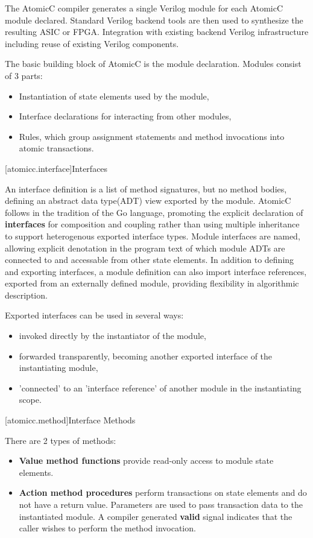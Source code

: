 The AtomicC compiler 
generates a single Verilog module for each AtomicC module declared.
Standard Verilog backend tools are then used to synthesize
the resulting ASIC or FPGA.
Integration with existing backend Verilog infrastructure including reuse of existing Verilog
components.

The basic building block of AtomicC is the module declaration.
Modules consist of 3 parts:
\begin{itemize}
\item Instantiation of state elements used by the module,
\item Interface declarations for interacting from other modules,
\item Rules, which group assignment statements and method invocations into atomic transactions.
\end{itemize}

[atomicc.interface]{Interfaces}

An interface definition is a list of method signatures, but no method bodies, defining
an abstract data type(ADT) \cite{Liskov74programmingwith} view exported by the module.
AtomicC follows in the tradition of the Go language\cite{Pike2012},
promoting the explicit declaration of \textbf{interfaces} for composition and
coupling rather than using multiple inheritance to support heterogenous exported interface types.
Module interfaces are named, 
allowing explicit denotation in the program text
of which module ADTs are connected to and accessable from other state elements.
In addition to defining and exporting interfaces,
a module definition can also import
interface references, exported from an
externally defined module, providing flexibility in algorithmic description.

Exported interfaces can be used in several ways:
\begin{itemize}
\item invoked directly by the instantiator of the module,
\item forwarded transparently, becoming another exported interface of the instantiating module,
\item 'connected' to an 'interface reference' of another module in the instantiating scope.
\end{itemize}

[atomicc.method]{Interface Methods}

There are 2 types of methods:
\begin{itemize}
\item \textbf{Value method functions} provide read-only access to module state elements.
\item \textbf{Action method procedures} perform transactions on state elements
and do not have a return value.
Parameters are used to pass transaction data to the instantiated module.
A compiler generated
\textbf{valid} signal indicates that the caller wishes to perform the method invocation.
\end{itemize}

